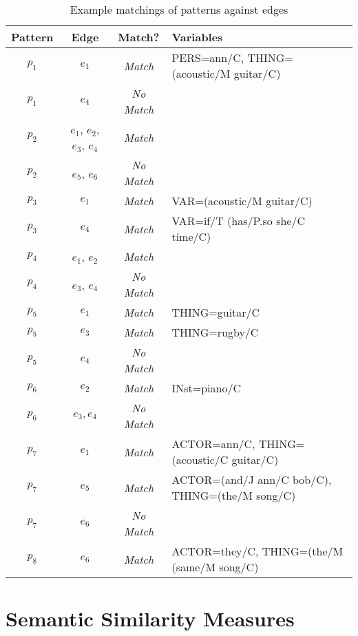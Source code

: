 \documentclass[11pt]{scrreprt}
\begin{document}
\begin{table}[ht]
\centering
\begin{tabular}{cccl}
\toprule
\textbf{Pattern} & \textbf{Edge} & \textbf{Match?} & \textbf{Variables} \\
\midrule
\(p_1\) & \(e_1\) & \textit{Match} & \textsf{PERS=ann/C, THING=(acoustic/M guitar/C)} \\
\(p_1\) & \(e_4\) & \textit{No Match} & \\
\(p_2\) & \(e_1\), \(e_2\), \(e_3\), \(e_4\) & \textit{Match} & \\
\(p_2\) & \(e_5\), \(e_6\) & \textit{No Match} & \\
\(p_3\) & \(e_1\) & \textit{Match} & \textsf{VAR=(acoustic/M guitar/C)} \\
\(p_3\) & \(e_4\) & \textit{Match} & \textsf{VAR=if/T (has/P.so she/C time/C)} \\
\(p_4\) & \(e_1\), \(e_2\) & \textit{Match} & \\
\(p_4\) & \(e_3\), \(e_4\)  & \textit{No Match} & \\
\(p_5\) & \(e_1\)  & \textit{Match} & \textsf{THING=guitar/C} \\
\(p_5\) & \(e_3\)  & \textit{Match} & \textsf{THING=rugby/C} \\
\(p_5\) & \(e_4\)  & \textit{No Match} & \\
\(p_6\) & \(e_2\)  & \textit{Match} & \textsf{IN\gls{st}=piano/C} \\
\(p_6\) & \(e_3, e_4\)  & \textit{No Match} & \\
\(p_7\) & \(e_1\)  & \textit{Match} & \textsf{ACTOR=ann/C, THING=(acoustic/C guitar/C)}\\
\(p_7\) & \(e_5\)  & \textit{Match} & \textsf{ACTOR=(and/J ann/C bob/C), THING=(the/M song/C)}\\
\(p_7\) & \(e_6\)  & \textit{No Match} & \\
\(p_8\) & \(e_6\)  & \textit{Match} & \textsf{ACTOR=they/C, THING=(the/M (same/M song/C)}\\
\bottomrule
\end{tabular}
\caption{Example matchings of patterns against edges}
\label{tab:shpl-example-matchings}
\vspace{2\baselineskip}
\end{table}



\section{Semantic Similarity Measures}
\label{sec:semantic-similarity}
\end{document}
